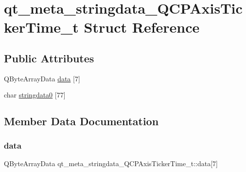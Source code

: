 \hypertarget{structqt__meta__stringdata__QCPAxisTickerTime__t}{}\section{qt\+\_\+meta\+\_\+stringdata\+\_\+\+Q\+C\+P\+Axis\+Ticker\+Time\+\_\+t Struct Reference}
\label{structqt__meta__stringdata__QCPAxisTickerTime__t}
\subsection*{Public Attributes}
\begin{DoxyCompactItemize}
\item 
Q\+Byte\+Array\+Data \mbox{\hyperlink{structqt__meta__stringdata__QCPAxisTickerTime__t_a0e812edae0b72b531ae152e0bed2a3f5}{data}} \mbox{[}7\mbox{]}
\item 
char \mbox{\hyperlink{structqt__meta__stringdata__QCPAxisTickerTime__t_aad085a5c9bf7f31e1826758e85aebe4e}{stringdata0}} \mbox{[}77\mbox{]}
\end{DoxyCompactItemize}


\subsection{Member Data Documentation}
\mbox{\label{structqt__meta__stringdata__QCPAxisTickerTime__t_a0e812edae0b72b531ae152e0bed2a3f5}} 
\subsubsection{\texorpdfstring{data}{data}}
{\footnotesize\ttfamily Q\+Byte\+Array\+Data qt\+\_\+meta\+\_\+stringdata\+\_\+\+Q\+C\+P\+Axis\+Ticker\+Time\+\_\+t\+::data\mbox{[}7\mbox{]}}

\mbox{\label{structqt__meta__stringdata__QCPAxisTickerTime__t_aad085a5c9bf7f31e1826758e85aebe4e}} 
